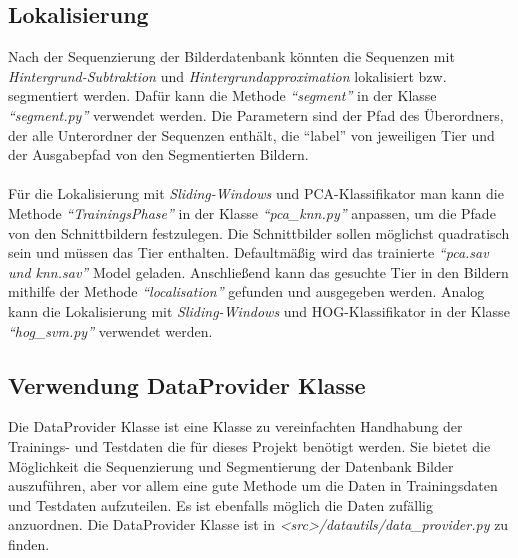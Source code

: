 \subsection*{Lokalisierung}
Nach der Sequenzierung der Bilderdatenbank könnten die Sequenzen mit \textit{Hintergrund-Subtraktion} und \textit{Hintergrundapproximation} lokalisiert bzw. segmentiert werden. Dafür kann die Methode \textit{``segment''} in der Klasse \textit{``segment.py''} verwendet werden.
Die Parametern sind der Pfad des Überordners, der alle Unterordner der Sequenzen enthält, die ``label'' von jeweiligen Tier und der Ausgabepfad von den Segmentierten Bildern.\\\\
Für die Lokalisierung mit \textit{Sliding-Windows} und PCA-Klassifikator man kann die Methode \textit{``TrainingsPhase''} in der Klasse \textit{``pca\_knn.py''} anpassen, um die Pfade von den Schnittbildern festzulegen. Die Schnittbilder sollen möglichst quadratisch sein und müssen das Tier enthalten. Defaultmäßig wird das trainierte \textit{``pca.sav und knn.sav''} Model geladen. Anschließend kann das gesuchte Tier in den Bildern mithilfe der Methode \textit{``localisation''} gefunden und ausgegeben werden. Analog kann die Lokalisierung mit \textit{Sliding-Windows} und HOG-Klassifikator in der Klasse \textit{``hog\_svm.py''} verwendet werden.

\subsection*{Verwendung DataProvider Klasse}
Die DataProvider Klasse ist eine Klasse zu vereinfachten Handhabung der Trainings- und Testdaten die für dieses Projekt benötigt werden. Sie bietet die Möglichkeit die Sequenzierung und Segmentierung der Datenbank Bilder auszuführen, aber vor allem eine gute Methode um die Daten in Trainingsdaten und Testdaten aufzuteilen. Es ist ebenfalls möglich die Daten zufällig anzuordnen. Die DataProvider Klasse ist in \emph{<src>/datautils/data\_provider.py} zu finden.

